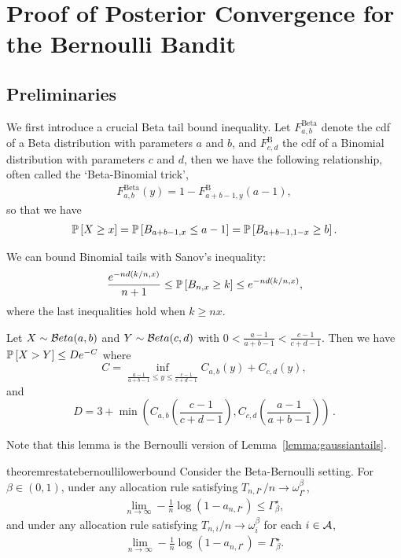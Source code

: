 \section{Proof of Posterior Convergence for the Bernoulli Bandit}\label{app:posterior_beta}

\subsection{Preliminaries}\label{app:posterior_beta.pre}

We first introduce a crucial Beta tail bound inequality. Let $F^{\text{Beta}}_{a,b}$ denote the cdf of a Beta distribution with parameters $a$ and $b$, and $F^{\text{B}}_{c,d}$ the cdf of a Binomial distribution with parameters $c$ and $d$, then we have the following relationship, often called the `Beta-Binomial trick',
\begin{align*}
F^{\text{Beta}}_{a,b}(y) = 1 - F^{\text{B}}_{a+b-1, y} (a-1), 
\end{align*}
so that we have
\begin{align*}
\mathbb{P}\left[X \geq x\right] = \mathbb{P}\left[B_{a+b-1,x}  \leq a-1 \right] = \mathbb{P}\left[B_{a+b-1,1-x} \geq b\right].
\end{align*}

We can bound Binomial tails with Sanov's inequality:
\begin{align*}
    \frac{ e^{-n d \left( k / n, x \right)}  }{n+1} \leq \mathbb{P}\left[B_{n,x} \geq k\right] \leq e^{-n d \left( k / n, x \right)},
\end{align*}
where the last inequalities hold when $k \geq nx$.

\begin{lemma}\label{lemma:binomial_tail}
Let $X \sim \mathcal{B} eta(a, b)$ and $Y\sim \mathcal{B} eta(c, d)$ with $0 < \frac{a-1}{a+b-1} < \frac{c-1}{c+d-1}$. Then we have $\mathbb{P}\left[X > Y\right] \leq D e^{-C}$ where
\[
    C = \inf_{\frac{a-1}{a+b-1} \leq y \leq \frac{c-1}{c+d-1}} C_{a,b}(y)+C_{c,d}(y),
\]
and
\[
    D = 3 + \min \left( C_{a,b}\left(\frac{c-1}{c+d-1}\right), C_{c,d}\left(\frac{a-1}{a+b-1}\right) \right)\,.
\]
\end{lemma}
Note that this lemma is the Bernoulli version of Lemma~\ref{lemma:gaussiantails}.
\begin{restatable}{theorem}{restatebernoullilowerbound}\label{thm:bernoulli_lower_bound}
	Consider the Beta-Bernoulli setting. For $\beta \in (0,1)$, under any allocation rule satisfying 
	$T_{n, I^\star} / n \rightarrow \omega_{I^\star}^\beta$,
	\begin{align*}
	\lim_{n \rightarrow \infty} - \frac{1}{n} \log(1 - a_{n,I^\star}) \leq \Gamma_{\beta}^\star,
	\end{align*}
	and under any allocation rule satisfying $T_{n, i} / n \rightarrow \omega_i^\beta$ for each $i \in \mathcal{A}$,
	\begin{align*}
		\lim_{n \rightarrow \infty} - \frac{1}{n} \log(1 - a_{n,I^\star}) = \Gamma_{\beta}^\star.
	\end{align*}
\end{restatable}


